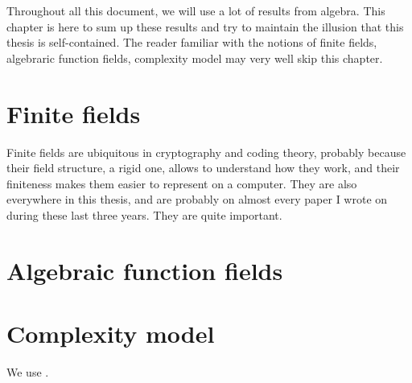 Throughout all this document, we will use a lot of results from algebra. This
chapter is here to sum up these results and try to maintain the illusion that
this thesis is self-contained. The reader familiar with the notions of finite
fields, algebraric function fields, complexity model may very well skip this
chapter.

\section{Finite fields}
Finite fields are ubiquitous in cryptography and coding theory, probably because
their field structure, a rigid one, allows to understand how they work, and
their finiteness makes them easier to represent on a computer. They are also
everywhere in this thesis, and are probably on almost every paper I
wrote on during these last three years. They are quite important.

\section{Algebraic function fields}
\section{Complexity model}
We use \cite{GG13}.
